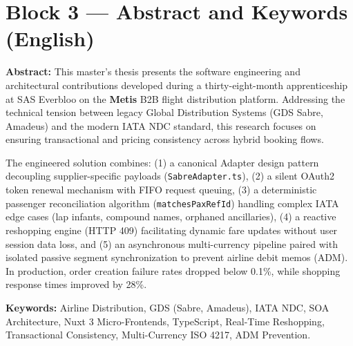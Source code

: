 \documentclass[11pt,a4paper]{article}
\begin{document}
\section*{Block 3 — Abstract and Keywords (English)}
\begin{tcolorbox}[colback=LightGray, colframe=DarkSlate, arc=4pt, boxrule=0.8pt]
\textbf{Abstract:} This master's thesis presents the software engineering and architectural contributions developed during a thirty-eight-month apprenticeship at SAS Everbloo on the \textbf{Metis} B2B flight distribution platform. Addressing the technical tension between legacy Global Distribution Systems (GDS Sabre, Amadeus) and the modern IATA NDC standard, this research focuses on ensuring transactional and pricing consistency across hybrid booking flows.

The engineered solution combines: (1) a canonical Adapter design pattern decoupling supplier-specific payloads (\texttt{SabreAdapter.ts}), (2) a silent OAuth2 token renewal mechanism with FIFO request queuing, (3) a deterministic passenger reconciliation algorithm (\texttt{matchesPaxRefId}) handling complex IATA edge cases (lap infants, compound names, orphaned ancillaries), (4) a reactive reshopping engine (HTTP 409) facilitating dynamic fare updates without user session data loss, and (5) an asynchronous multi-currency pipeline paired with isolated passive segment synchronization to prevent airline debit memos (ADM). In production, order creation failure rates dropped below 0.1\%, while shopping response times improved by 28\%.

\vspace{0.2cm}
\textbf{Keywords:} Airline Distribution, GDS (Sabre, Amadeus), IATA NDC, SOA Architecture, Nuxt 3 Micro-Frontends, TypeScript, Real-Time Reshopping, Transactional Consistency, Multi-Currency ISO 4217, ADM Prevention.
\end{tcolorbox}
\end{document}
